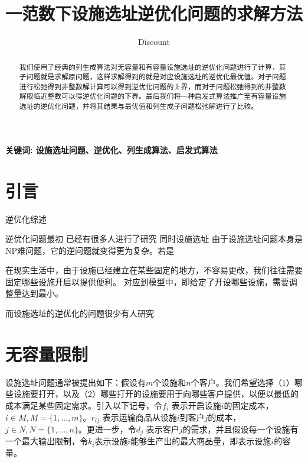 \documentclass[UTF8]{article}
\author {Dis\cdot count}
\title {一范数下设施选址逆优化问题的求解方法}
\date{}
\begin{document}
    \maketitle

\begin{abstract}

我们使用了经典的列生成算法对无容量和有容量设施选址的逆优化问题进行了计算，其子问题就是求解原问题，这样求解得到的就是对应设施选址的逆优化最优值。对子问题进行松弛得到非整数解计算可以得到逆优化问题的上界，而对子问题松弛得到的非整数解取临近整数可以得逆优化问题的下界。最后我们将一种启发式算法推广至有容量设施选址的逆优化问题，并将其结果与最优值和列生成子问题松弛解进行了比较。

\end{abstract}

\qquad \textbf{关键词: 设施选址问题、逆优化、列生成算法、启发式算法}

\section{引言}  %
逆优化综述

逆优化问题最初
已经有很多人进行了研究
同时设施选址
由于设施选址问题本身是NP难问题，它的逆问题就变得更为复杂。若是

在现实生活中，由于设施已经建立在某些固定的地方，不容易更改，我们往往需要固定哪些设施开启以提供便利。
对应到模型中，即给定了开设哪些设施，需要调整量达到最小。

而设施选址的逆优化的问题很少有人研究

\section{无容量限制}

设施选址问题通常被提出如下：假设有$m$个设施和$n$个客户。我们希望选择（1）哪些设施要打开，以及（2）哪些打开的设施要用于向哪些客户提供，以便以最低的成本满足某些固定需求。引入以下记号，令$f_i$ 表示开启设施$i$的固定成本，$i \in M, M=\{1,\ldots,m\}$。$r_{ij}$ 表示运输商品从设施$i$到客户$j$的成本，$j \in N, N=\{1,\ldots,n\}$。更进一步，令$d_j$ 表示客户$j$的需求，并且假设每一个设施有一个最大输出限制，令$k_i$表示设施$i$能够生产出的最大商品量，即表示设施$i$的容量。
\end{document}
